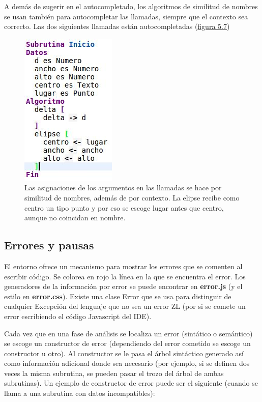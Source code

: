 \documentclass{report}
\begin{document}
	\vspace{10px}
	
	A demás de sugerir en el autocompletado, los algoritmos de similitud de nombres se usan también para autocompletar las llamadas, siempre que el contexto sea correcto. Las dos siguientes llamadas están autocompletadas (\hyperref[fig:autocompletado2]{figura 5.7})
	
\begin{figure}
\centering
\includegraphics[width=0.4\linewidth]{autocompletado}
\caption[Autocompletado con filtro por tipos]{Las asignaciones de los argumentos en las llamadas se hace por similitud de nombres, además de por contexto. La elipse recibe como centro un tipo punto y por eso se escoge lugar antes que centro, aunque no coincidan en nombre.}
\label{fig:autocompletado2}
\end{figure}

	
	\subsection{Errores y pausas}
	
	El entorno ofrece un mecanismo para mostrar los errores que se comenten al escribir código. Se colorea en rojo la línea en la que se encuentra el error. Los generadores de la información por error se puede encontrar en \textbf{error.js} (y el estilo en \textbf{error.css}). Existe una clase Error que se usa para distinguir de cualquier Excepción del lenguaje que no sea un error ZL (por si se comete un error escribiendo el código Javascript del IDE).
	
	\vspace{10px}
	
	Cada vez que en una fase de análisis se localiza un error (sintático o semántico) se escoge un constructor de error (dependiendo del error cometido se escoge un constructor u otro). Al constructor se le pasa el árbol sintáctico generado así como información adicional donde sea necesario (por ejemplo, si se definen dos veces la misma subrutina, se pueden pasar el trozo del árbol de ambas subrutinas). Un ejemplo de constructor de error puede ser el siguiente (cuando se llama a una subrutina con datos incompatibles):
	
\end{document}

